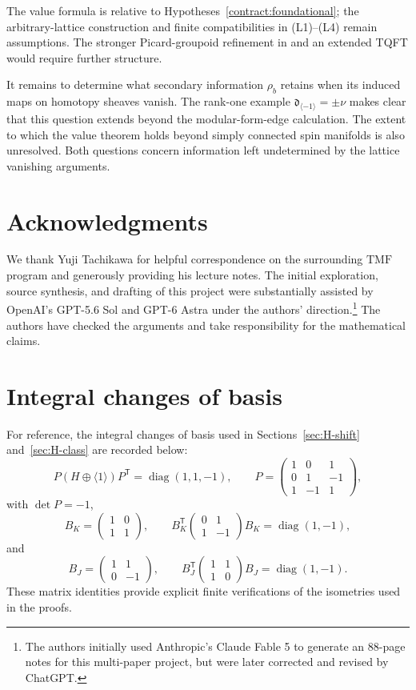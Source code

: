 \documentclass[11pt,a4paper]{amsart}
\newcommand{\TMF}{\mathrm{TMF}}
\newcommand{\dclass}{\mathfrak d}
\theoremstyle{plain}
\theoremstyle{definition}
\theoremstyle{remark}
\begin{document}
The value formula is relative to
Hypotheses~\ref{contract:foundational}; the arbitrary-lattice
construction and finite compatibilities in \textup{(L1)--(L4)}
remain assumptions. The stronger Picard-groupoid refinement in
\cite[Conjecture~4.6]{GKMP} and an extended TQFT would require
further structure.

It remains to determine what secondary information
$\rho_b$ retains when its induced maps on homotopy sheaves
vanish. The rank-one example
$\dclass_{\langle-1\rangle}=\pm\nu$ makes clear that
this question extends beyond the modular-form-edge calculation.
The extent to which the value theorem holds beyond simply
connected spin manifolds is also unresolved. Both questions
concern information left undetermined by the lattice vanishing
arguments.

\section*{Acknowledgments}

We thank Yuji Tachikawa for helpful correspondence on the surrounding $\TMF$ program and generously providing his lecture notes. The initial exploration, source synthesis, and drafting of this project were substantially assisted by OpenAI's GPT-5.6 Sol and GPT-6 Astra under the authors' direction.\footnote{The authors initially used Anthropic's Claude Fable 5 to generate an 88-page notes for this multi-paper project, but were later corrected and revised by ChatGPT.} The authors have checked the arguments and take responsibility for the mathematical claims.

\appendix
\section{Integral changes of basis}\label{app:certificates}

For reference, the integral changes of basis used in
Sections~\ref{sec:H-shift} and~\ref{sec:H-class} are recorded
below:
\[
 P(H\oplus\langle1\rangle)P^{\mathsf T}
 =\operatorname{diag}(1,1,-1),
 \qquad
 P=\begin{pmatrix}1&0&1\\0&1&-1\\1&-1&1\end{pmatrix},
\]
with $\det P=-1$,
\[
 B_K=\begin{pmatrix}1&0\\1&1\end{pmatrix},
 \qquad
 B_K^{\mathsf T}
 \begin{pmatrix}0&1\\1&-1\end{pmatrix}
 B_K
 =\operatorname{diag}(1,-1),
\]
and
\[
 B_J=\begin{pmatrix}1&1\\0&-1\end{pmatrix},
 \qquad
 B_J^{\mathsf T}
 \begin{pmatrix}1&1\\1&0\end{pmatrix}
 B_J
 =\operatorname{diag}(1,-1).
\]
These matrix identities provide explicit finite
verifications of the isometries used in the proofs.
\end{document}
